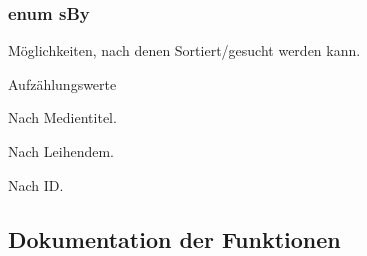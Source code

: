 \subsubsection[{\texorpdfstring{s\+By}{sBy}}]{\setlength{\rightskip}{0pt plus 5cm}enum {\bf s\+By}}\hypertarget{group___lend_lib_item_ga557119015745f6890b5eb4367beba8f3}{}\label{group___lend_lib_item_ga557119015745f6890b5eb4367beba8f3}


Möglichkeiten, nach denen Sortiert/gesucht werden kann. 

\begin{Desc}
\item[Aufzählungswerte]\par
\begin{description}
\item[{\em 
title\hypertarget{group___lend_lib_item_gga557119015745f6890b5eb4367beba8f3ae9eadc6828eb5edd3ed076e4f07a551b}{}\label{group___lend_lib_item_gga557119015745f6890b5eb4367beba8f3ae9eadc6828eb5edd3ed076e4f07a551b}
}]Nach Medientitel. \item[{\em 
lendee\hypertarget{group___lend_lib_item_gga557119015745f6890b5eb4367beba8f3af2cee0a493fa3e44b3dca715f7202db9}{}\label{group___lend_lib_item_gga557119015745f6890b5eb4367beba8f3af2cee0a493fa3e44b3dca715f7202db9}
}]Nach Leihendem. \item[{\em 
id\hypertarget{group___lend_lib_item_gga557119015745f6890b5eb4367beba8f3a280d7329079c73a4a5df3f35697b60b1}{}\label{group___lend_lib_item_gga557119015745f6890b5eb4367beba8f3a280d7329079c73a4a5df3f35697b60b1}
}]Nach ID. \end{description}
\end{Desc}


\subsection{Dokumentation der Funktionen}
